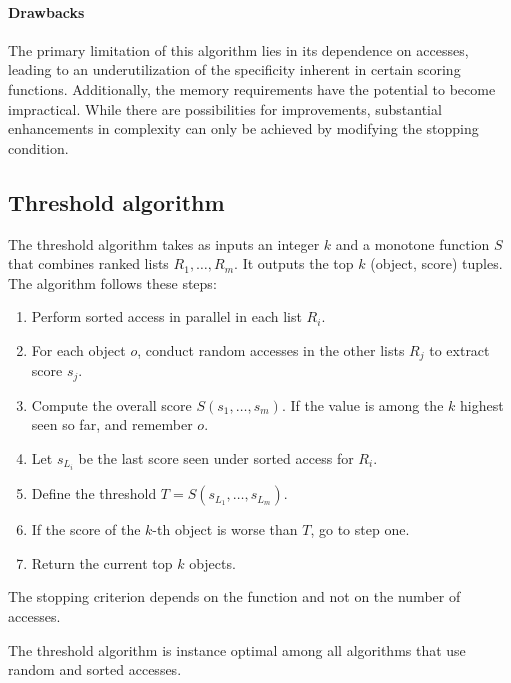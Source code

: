 \paragraph*{Drawbacks}
The primary limitation of this algorithm lies in its dependence on accesses, leading to an underutilization of the specificity inherent in certain scoring functions. 
Additionally, the memory requirements have the potential to become impractical.
While there are possibilities for improvements, substantial enhancements in complexity can only be achieved by modifying the stopping condition.

\subsection{Threshold algorithm}
The threshold algorithm takes as inputs an integer $k$ and a monotone function $S$ that combines ranked lists $R_1,\dots,R_m$. 
It outputs the top $k$ (object, score) tuples. 
The algorithm follows these steps:
\begin{enumerate}
    \item Perform sorted access in parallel in each list $R_i$. 
    \item For each object $o$, conduct random accesses in the other lists $R_j$ to extract score $s_j$. 
    \item Compute the overall score $S(s_1, \dots, s_m)$. 
        If the value is among the $k$ highest seen so far, and remember $o$. 
    \item Let $s_{L_i}$ be the last score seen under sorted access for $R_i$. 
    \item Define the threshold $T=S(s_{L_1}, \dots, s_{L_m})$. 
    \item If the score of the $k$-th object is worse than $T$, go to step one. 
    \item Return the current top $k$ objects. 
\end{enumerate}
The stopping criterion depends on the function and not on the number of accesses. 
\begin{property}
    The threshold algorithm is instance optimal among all algorithms that use random and sorted accesses. 
\end{property}
